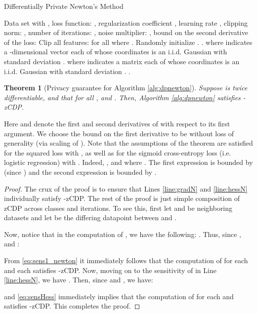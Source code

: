 \documentclass[letterpaper]{article} \usepackage{fullpage}
\newtheorem{thm}[lem]{Theorem}
\begin{document}
\begin{algorithm}[ht]
\caption{Differentially Private Newton's Method}
\begin{algorithmic}[1]

\REQUIRE Data set  with , loss function: , regularization coefficient , learning rate , clipping norm: , 
number of iterations: , noise multiplier: , bound on the second derivative of the loss: 
\STATE Clip all features:  for all  where {}.
\STATE Randomly initialize .
\FOR{}
\FOR{}
{\STATE {}}.
{\STATE {}}
{\STATE  where  indicates a -dimensional vector each of whose coordinates is an i.i.d. Gaussian with standard deviation .\label{line:gradN}}
{\STATE  where  indicates a  matrix each of whose coordinates is an i.i.d. Gaussian with standard deviation .\label{line:hessN}}
{\STATE  \label{line:newton-solution}}
\ENDFOR
\ENDFOR
{ \label{eq:lastDPSGD}.}
\end{algorithmic}
\label{alg:dpnewton}
\end{algorithm}



\begin{thm}[Privacy guarantee for Algorithm \ref{alg:dpnewton}]
Suppose  is twice differentiable, and that for all ,  and . Then, Algorithm \ref{alg:dpnewton} satisfies -zCDP.
\end{thm}

Here  and  denote the first and second derivatives of  with respect to its first argument. We choose the bound on the first derivative to be  without loss of generality (via scaling of ). Note that the assumptions of the theorem are satisfied for the squared loss  with , as well as for the sigmoid cross-entropy loss (i.e. logistic regression) with . Indeed, , and  where . The first expression is bounded by  (since ) and the second expression is bounded by .

\begin{proof}
The crux of the proof is to ensure that Lines \ref{line:gradN} and \ref{line:hessN} individually satisfy -zCDP. The rest of the proof is just simple composition of zCDP \cite{bun2016concentrated} across  classes and  iterations. To see this, first let  and  be neighboring datasets and let  be the differing datapoint between  and . 

Now, notice that in the computation of , we have the following: . Thus, since , and :

From \eqref{eq:sens1_newton} it immediately follows that the computation of  for each  and each  satisfies -zCDP. Now, moving on to the sensitivity of  in Line \ref{line:hessN}, we have . Then, since  and , we have:

and \eqref{eq:sensHess} immediately implies that the computation of  for each  and  satisfies -zCDP. This completes the proof.
\end{proof}
\end{document}
